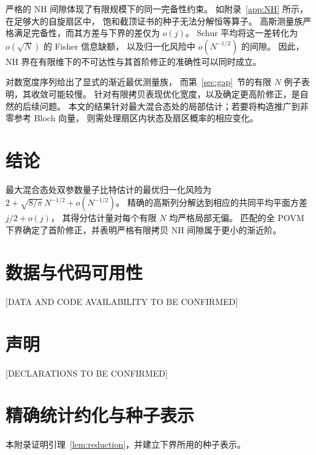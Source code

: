 \documentclass[aps,pra,reprint,superscriptaddress,longbibliography]{revtex4-2}
\theoremstyle{remark}
\begin{document}
严格的 NH 间隙体现了有限规模下的同一完备性约束。
如附录~\ref{app:NH} 所示，在足够大的自旋扇区中，
饱和截顶证书的种子无法分解恒等算子。
高斯测量族严格满足完备性，而其方差与下界的差仅为 $o(j)$。
Schur 平均将这一差转化为 $o(\sqrt N)$ 的 Fisher 信息缺额，
以及归一化风险中 $o(N^{-1/2})$ 的间隙。
因此，NH 界在有限维下的不可达性与其首阶修正的准确性可以同时成立。

对数宽度序列给出了显式的渐近最优测量族，
而第~\ref{sec:gap}~节的有限 $N$ 例子表明，其收敛可能较慢。
针对有限拷贝表现优化宽度，以及确定更高阶修正，是自然的后续问题。
本文的结果针对最大混合态处的局部估计；若要将构造推广到非零参考 Bloch 向量，
则需处理扇区内状态及扇区概率的相应变化。

\section{结论}\label{sec:conclusions}

最大混合态处双参数量子比特估计的最优归一化风险为
$2+\sqrt{8/\pi}\,N^{-1/2}+o(N^{-1/2})$。
精确的高斯列分解达到相应的共同平均平面方差 $j/2+o(j)$，
其得分估计量对每个有限 $N$ 均严格局部无偏。
匹配的全 POVM 下界确定了首阶修正，并表明严格有限拷贝 NH 间隙属于更小的渐近阶。

\section*{数据与代码可用性}
[DATA AND CODE AVAILABILITY TO BE CONFIRMED]

\renewcommand{\acknowledgmentsname}{致谢}
\begin{acknowledgments}
\end{acknowledgments}

\section*{声明}
[DECLARATIONS TO BE CONFIRMED]

\appendix

\section{精确统计约化与种子表示}

\label{app:reduction}
本附录证明引理~\ref{lem:reduction}，并建立下界所用的种子表示。
\end{document}
